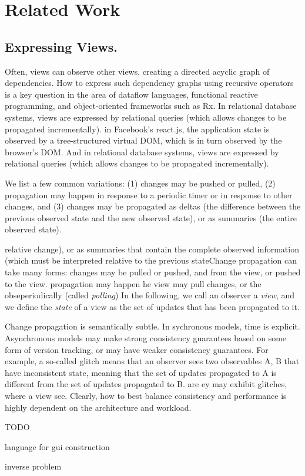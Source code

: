 \section{Related Work}

\subsection{Expressing Views.} Often, views can observe other views, creating a directed acyclic graph of dependencies. How to express such dependency graphs using recursive operators is a key question in the area of dataflow languages, functional reactive programming, and object-oriented frameworks such as Rx. In relational database systems, views are expressed by relational queries (which allows changes to be propagated incrementally). in Facebook's react.js, the application state is observed by a tree-structured virtual DOM, which is in turn observed by the browser's DOM. And in relational database systems, views are expressed by relational queries (which allows changes to be propagated incrementally). 

We list a few common variations: (1) changes may be pushed or pulled, (2) propagation may happen in response to a periodic timer or in response to other changes, and (3) changes may be propagated as deltas (the difference between the previous observed state and the new observed state), or as summaries (the entire observed state).

  relative change), or as summaries that contain the complete observed information  (which must be interpreted relative to the previous stateChange propagation can take many forms: changes may be pulled or pushed, and from the view, or pushed to the view. propagation may happen he view may pull changes, or the obseperiodically (called \emph{polling}) In the following, we call an observer a \emph{view}, and we define the \emph{state} of a view as the set of updates that has been propagated to it. 




Change propagation is semantically subtle. In sychronous models, time is explicit. Asynchronous models may make strong consistency guarantees based on some form of version tracking, or may have weaker consistency guarantees. For example, a so-called glitch means that an observer sees two observables A, B that have inconsistent state, meaning that the set of updates propagated to A is different from the set of updates propagated to B. are ey may exhibit glitches, where a view see. Clearly, how to best balance consistency and performance is highly dependent on the architecture and workload. 

TODO
\cite{burckhardt-leijen-yi-sadowski-ball-OOPSLA11}
\cite{camil}


\cite{alive}
\cite{react}

\cite{elm} language for gui construction

\cite{statelines} inverse problem


